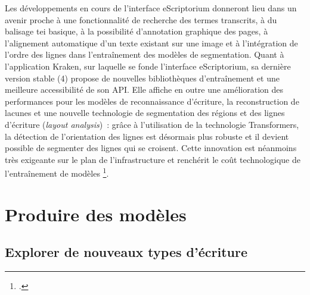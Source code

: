 \documentclass[a4paper,12pt,twoside]{book}
\begin{document}
				Les développements en cours de l'interface eScriptorium donneront lieu
				dans un avenir proche à une fonctionnalité de recherche des termes
				transcrits, à du balisage \gls{tei} basique, à la possibilité d'annotation
				graphique des pages, à l'alignement automatique d'un texte existant sur
				une image et à l'intégration de l'ordre des lignes dans l'entraînement
				des modèles de \gls{segmentation}. Quant à l'application Kraken, sur laquelle
				se fonde l'interface eScriptorium, sa dernière version stable (4)
				propose de nouvelles bibliothèques d'entraînement et une meilleure
				accessibilité de son API. Elle affiche en outre une amélioration des
				performances pour les modèles de reconnaissance d'écriture, la
				reconstruction de lacunes et une nouvelle technologie de \gls{segmentation}
				des régions et des lignes d'écriture (\textit{layout analysis})~: 
				grâce à l'utilisation de la technologie Transformers, la détection de
				l'orientation des lignes est désormais plus robuste et il devient
				possible de segmenter des lignes qui se croisent. Cette innovation est
				néanmoins très exigeante sur le plan de l'infrastructure et renchérit le
				coût technologique de l'entraînement de modèles
				\footcite{kiesslingNewDevelopmentsKraken2022}.
		
		\section{Produire des modèles}
		
			\subsection{Explorer de nouveaux types d'écriture}
			
\end{document}

